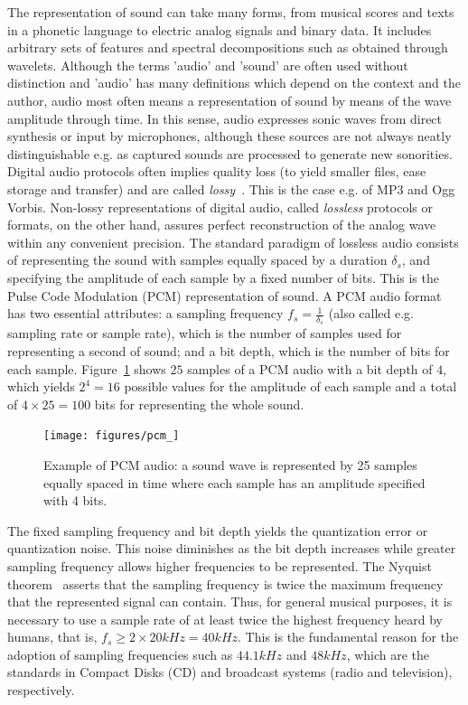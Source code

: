 The representation of sound can take many forms,
from musical scores and texts in a phonetic language to electric analog signals and binary data.
It includes arbitrary sets of features and spectral decompositions such as obtained through wavelets.
Although the terms 'audio' and 'sound' are often used without distinction
and 'audio' has many definitions which depend on the context and the author,
audio most often means a representation of sound by means
of the wave amplitude through time.
In this sense,
audio expresses sonic waves from direct synthesis or input by microphones,
although these sources are not always neatly distinguishable
e.g. as captured sounds are processed to generate new sonorities.
Digital audio protocols often implies quality loss (to yield smaller files, ease storage and transfer)
and are called \emph{lossy}~\cite{loss}.
This is the case e.g. of MP3 and Ogg Vorbis.
Non-lossy representations of digital audio, called \emph{lossless} protocols or formats,
on the other hand, assures perfect reconstruction of the analog wave within any convenient precision.
The standard paradigm of lossless audio consists of
representing the sound with samples equally spaced
by a duration $\delta_s$, and specifying the amplitude of each sample by a fixed number of bits.
This is the Pulse Code Modulation (PCM) representation of sound.
A PCM audio format has two essential attributes:
a sampling frequency $f_s=\frac{1}{\delta_s}$ (also called e.g. sampling rate or sample rate),
which is the number of samples used for representing a second of sound;
and a bit depth, which is the number of bits for each sample.
Figure~\ref{fig:PCM} shows $25$ samples of a PCM audio with a bit depth of $4$,
which yields $2^4=16$ possible values for the amplitude of each sample
and a total of $4 \times 25= 100$ bits for representing the whole sound.

\begin{figure}
    \centering
        \texttt{[image: figures/pcm\_]}
	\caption{Example of PCM audio:
	a sound wave is represented by 25 samples equally spaced in time where each sample has an amplitude specified with 4 bits.}
        \label{fig:PCM}
\end{figure}

The fixed sampling frequency and bit depth
yields the quantization error or quantization noise.
This noise diminishes as the bit depth increases
while greater sampling frequency allows higher frequencies to be represented.
The Nyquist theorem~\cite{Openheim} asserts that the sampling frequency
is twice the maximum frequency that the represented signal can contain.
Thus, for general musical purposes, it is necessary to use a sample rate of
at least twice the highest frequency heard by humans,
that is, $f_s \geq 2\times 20kHz = 40kHz$.
This is the fundamental reason for the adoption of sampling frequencies
such as $44.1kHz$ and $48kHz$,
which are the standards in Compact Disks (CD)
and broadcast systems (radio and television), respectively.

